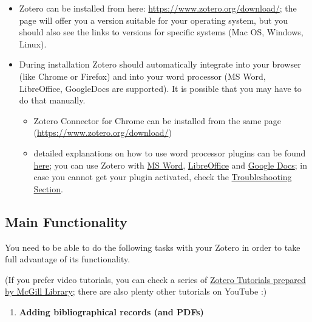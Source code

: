 \documentclass[
]{book}
\providecommand{\tightlist}{%
  \setlength{\itemsep}{0pt}\setlength{\parskip}{0pt}}
\begin{document}
\begin{itemize}
\tightlist
\item
  Zotero can be installed from here: \url{https://www.zotero.org/download/}; the page will offer you a version suitable for your operating system, but you should also see the links to versions for specific systems (Mac OS, Windows, Linux).
\item
  During installation Zotero should automatically integrate into your browser (like Chrome or Firefox) and into your word processor (MS Word, LibreOffice, GoogleDocs are supported). It is possible that you may have to do that manually.

  \begin{itemize}
  \tightlist
  \item
    Zotero Connector for Chrome can be installed from the same page (\url{https://www.zotero.org/download/})
  \item
    detailed explanations on how to use word processor plugins can be found \href{https://www.zotero.org/support/word_processor_integration}{here}; you can use Zotero with \href{https://www.zotero.org/support/word_processor_plugin_usage}{MS Word}, \href{https://www.zotero.org/support/libreoffice_writer_plugin_usage}{LibreOffice} and \href{https://www.zotero.org/support/google_docs}{Google Docs}; in case you cannot get your plugin activated, check the \href{https://www.zotero.org/support/word_processor_plugin_troubleshooting}{Troubleshooting Section}.
  \end{itemize}
\end{itemize}

\hypertarget{main-functionality}{%
\subsection{Main Functionality}\label{main-functionality}}

You need to be able to do the following tasks with your Zotero in order to take full advantage of its functionality.

(If you prefer video tutorials, you can check a series of \href{https://www.youtube.com/playlist?list=PL4asXgsr6ek5H5mM9GlA1d-YCb9KvP3Ja}{Zotero Tutorials prepared by McGill Library}; there are also plenty other tutorials on YouTube :)

\begin{enumerate}
\def\labelenumi{\arabic{enumi}.}
\tightlist
\item
  \textbf{Adding bibliographical records (and PDFs)}
\end{enumerate}
\end{document}
